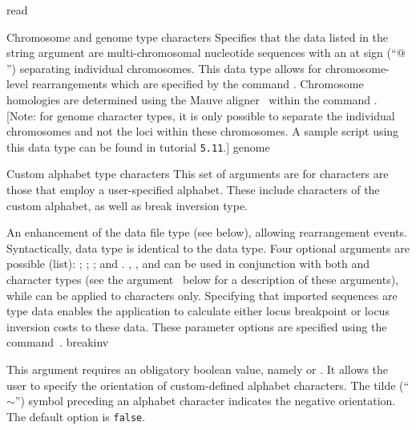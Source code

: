 \begin{command}{read}{}
\begin{arguments}
\begin{argumentgroup}{Chromosome and genome type characters}
{Specifies that the data listed in the string argument are
multi-chromosomal nucleotide sequences with an at sign (``$@$'') 
separating individual chromosomes. This data type
allows for chromosome-level rearrangements which are specified by
the command . Chromosome
homologies are determined using the Mauve aligner~\cite{darlingetal2004} within 	 	
the command . [Note: for genome
character types, it is only possible to separate the individual chromosomes and 
not the loci within these chromosomes. A sample script using this data type 
can be found in tutorial \texttt{5.11}.]} 
{genome}

\end{argumentgroup}


\begin{argumentgroup}{Custom alphabet type characters}
This set of arguments are for characters are those that employ a user-specified alphabet. 
These include characters of the custom alphabet, as well as break inversion type.

{An enhancement of the data file type  (see below), allowing
rearrangement events. Syntactically,  data type is identical to the
 data type. Four optional arguments are possible (\poylident list): 
; ; ; and .
, , and  can be used in conjunction
with both  and  character types 
(see the argument~ below for a description of these arguments), 
while  can be applied to  characters only.
Specifying that imported sequences are  type data enables
the application to calculate either locus breakpoint or locus inversion costs to these data. These parameter
options are specified using the command~.} 
{breakinv}

\begin{description}

{This argument requires an obligatory boolean value, namely  or 
. It allows the user to specify the orientation of custom-defined alphabet
characters. The tilde (``$\sim$'') symbol preceding an alphabet character indicates the negative 
orientation. The default option is \texttt{false}. }
{}
\end{description}


\end{argumentgroup}
\end{arguments}
\end{command}
